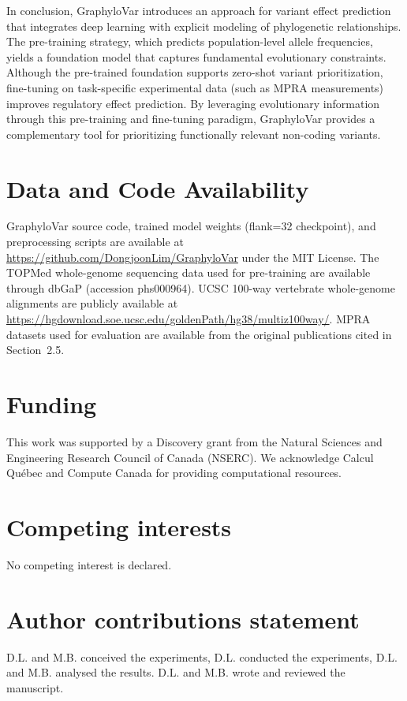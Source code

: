 \documentclass[unnumsec,webpdf,contemporary,large]{oup-authoring-template}%
\theoremstyle{thmstyleone}%
\theoremstyle{thmstyletwo}%
\theoremstyle{thmstylethree}%
\begin{document}
In conclusion, GraphyloVar introduces an approach for variant effect prediction that integrates deep learning with explicit modeling of phylogenetic relationships. The pre-training strategy, which predicts population-level allele frequencies, yields a foundation model that captures fundamental evolutionary constraints. Although the pre-trained foundation supports zero-shot variant prioritization, fine-tuning on task-specific experimental data (such as MPRA measurements) improves regulatory effect prediction. By leveraging evolutionary information through this pre-training and fine-tuning paradigm, GraphyloVar provides a complementary tool for prioritizing functionally relevant non-coding variants.




\section{Data and Code Availability}
GraphyloVar source code, trained model weights (flank=32 checkpoint), and preprocessing scripts are available at \url{https://github.com/DongjoonLim/GraphyloVar} under the MIT License. The TOPMed whole-genome sequencing data used for pre-training are available through dbGaP (accession phs000964). UCSC 100-way vertebrate whole-genome alignments are publicly available at \url{https://hgdownload.soe.ucsc.edu/goldenPath/hg38/multiz100way/}. MPRA datasets used for evaluation are available from the original publications cited in Section~2.5.

\section{Funding}
This work was supported by a Discovery grant from the Natural Sciences and Engineering Research Council of Canada (NSERC). We acknowledge Calcul Qu\'ebec and Compute Canada for providing computational resources.

\section{Competing interests}
No competing interest is declared.

\section{Author contributions statement}

D.L. and M.B. conceived the experiments, D.L. conducted the experiments, D.L. and M.B. analysed the results. D.L. and M.B. wrote and reviewed the manuscript.
\end{document}
